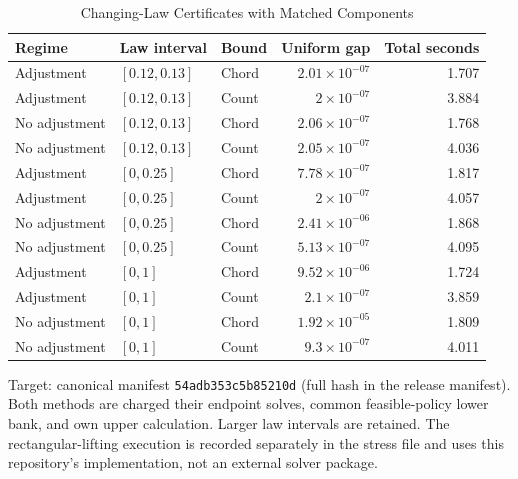 \begin{table}[t]
\caption{Changing-Law Certificates with Matched Components}\label{tab:computational}
\centering
\footnotesize
\begin{tabular}{@{}lllrr@{}}
\toprule
Regime & Law interval & Bound & Uniform gap & Total seconds \\
\midrule
Adjustment & $[0.12,0.13]$ & Chord & $2.01\times10^{-07}$ & 1.707 \\
Adjustment & $[0.12,0.13]$ & Count & $2\times10^{-07}$ & 3.884 \\
No adjustment & $[0.12,0.13]$ & Chord & $2.06\times10^{-07}$ & 1.768 \\
No adjustment & $[0.12,0.13]$ & Count & $2.05\times10^{-07}$ & 4.036 \\
Adjustment & $[0,0.25]$ & Chord & $7.78\times10^{-07}$ & 1.817 \\
Adjustment & $[0,0.25]$ & Count & $2\times10^{-07}$ & 4.057 \\
No adjustment & $[0,0.25]$ & Chord & $2.41\times10^{-06}$ & 1.868 \\
No adjustment & $[0,0.25]$ & Count & $5.13\times10^{-07}$ & 4.095 \\
Adjustment & $[0,1]$ & Chord & $9.52\times10^{-06}$ & 1.724 \\
Adjustment & $[0,1]$ & Count & $2.1\times10^{-07}$ & 3.859 \\
No adjustment & $[0,1]$ & Chord & $1.92\times10^{-05}$ & 1.809 \\
No adjustment & $[0,1]$ & Count & $9.3\times10^{-07}$ & 4.011 \\
\bottomrule
\end{tabular}
\par\smallskip\begin{minipage}{\linewidth}\footnotesize Target: canonical manifest \texttt{54adb353c5b85210d} (full hash in the release manifest). Both methods are charged their endpoint solves, common feasible-policy lower bank, and own upper calculation. Larger law intervals are retained. The rectangular-lifting execution is recorded separately in the stress file and uses this repository's implementation, not an external solver package.\end{minipage}
\end{table}
